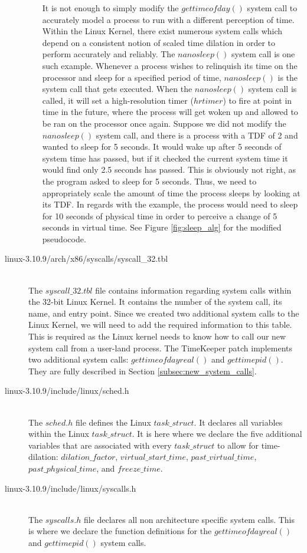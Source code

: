 \begin{description}
\begin{itemize}
                        It is not enough to simply modify the $gettimeofday()$ system call to accurately model a process to run with a different perception of time. Within the Linux Kernel, there exist numerous system calls which depend on a consistent notion of scaled time dilation in order to perform accurately and reliably. The $nanosleep()$ system call is one such example. Whenever a process wishes to relinquish its time on the processor and sleep for a specified period of time, $nanosleep()$ is the system call that gets executed. When the $nanosleep()$ system call is called, it will set a high-resolution timer ($hrtimer$) to fire at point in time in the future, where the process will get woken up and allowed to be ran on the processor once again. Suppose we did not modify the $nanosleep()$ system call, and there is a process with a TDF of 2 and wanted to sleep for 5 seconds. It would wake up after 5 seconds of system time has passed, but if it checked the current system time it would find only 2.5 seconds has passed. This is obviously not right, as the program asked to sleep for 5 seconds. Thus, we need to appropriately scale the amount of time the process sleeps by looking at its TDF. In regards with the example, the process would need to sleep for 10 seconds of physical time in order to perceive a change of 5 seconds in virtual time. See Figure \ref{fig:sleep_alg} for the modified pseudocode. 
        \end{itemize}
\item[linux-3.10.9/arch/x86/syscalls/syscall\_32.tbl] \hfill \\
        The $syscall\_32.tbl$ file contains information regarding system calls within the 32-bit Linux Kernel. It contains the number of the system call, its name, and entry point. Since we created two additional system calls to the Linux Kernel, we will need to add the required information to this table. This is required as the Linux kernel needs to know how to call our new system call from a user-land process. The TimeKeeper patch implements two additional system calls: $gettimeofdayreal()$ and $gettimepid()$. They are fully described in Section \ref{subsec:new_system_calls}.
\item[linux-3.10.9/include/linux/sched.h] \hfill \\
The $sched.h$ file defines the Linux $task\_struct$. It declares all variables within the Linux $task\_struct$. It is here where we declare the five additional variables that are associated with every $task\_struct$ to allow for time-dilation: $dilation\_factor$, $virtual\_start\_time$, $past\_virtual\_time$, $past\_physical\_time$, and $freeze\_time$. 
\item[linux-3.10.9/include/linux/syscalls.h] \hfill  \\
The $syscalls.h$ file declares all non architecture specific system calls. This is where we declare the function definitions for the $gettimeofdayreal()$ and $gettimepid()$ system calls. 
\end{description}
